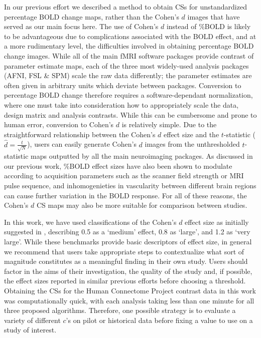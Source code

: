 In our previous effort we described a method to obtain CSs for unstandardized percentage BOLD change maps, rather than the Cohen's $d$ images that have served as our main focus here. The use of Cohen's $d$ instead of \%BOLD is likely to be advantageous due to complications associated with the BOLD effect, and at a more rudimentary level, the difficulties involved in obtaining percentage BOLD change images. While all of the main fMRI software packages provide contrast of parameter estimate maps, each of the three most widely-used analysis packages (AFNI, FSL \& SPM) scale the raw data differently; the parameter estimates are often given in arbitrary units which deviate between packages. Conversion to percentage BOLD change therefore requires a software-dependant normalization, where one must take into consideration how to appropriately scale the data, design matrix and analysis contrasts. While this can be cumbersome and prone to human error, conversion to Cohen's $d$ is relatively simple. Due to the straightforward relationship between the Cohen's $d$ effect size and the $t$-statistic \Big($\hat{d} = \frac{t}{\sqrt{N}}$\Big), users can easily generate Cohen's $d$ images from the unthresholded $t$-statistic maps outputted by all the main neuroimaging packages. As discussed in our previous work, \%BOLD effect sizes have also been shown to modulate according to acquisition parameters such as the scanner field strength or MRI pulse sequence, and inhomogenieties in vascularity between different brain regions can cause further variation in the BOLD response. For all of these reasons, the Cohen's $d$ CS maps may also be more suitable for comparison between studies. 

In this work, we have used classifications of the Cohen's $d$ effect size as initially suggested in \textit{\citet*{Cohen2013-it}}, describing 0.5 as a `medium' effect, 0.8 as `large', and 1.2 as `very large'. While these benchmarks provide basic descriptors of effect size, in general we recommend that users take appropriate steps to contextualize what sort of magnitude constitutes as a meaningful finding in their own study. Users should factor in the aims of their investigation, the quality of the study and, if possible, the effect sizes reported in similar previous efforts before choosing a threshold. Obtaining the CSs for the Human Connectome Project contrast data in this work was computationally quick, with each analysis taking less than one minute for all three proposed algorithms. Therefore, one possible strategy is to evaluate a variety of different $c$'s on pilot or historical data before fixing a value to use on a study of interest.

